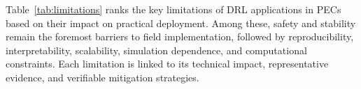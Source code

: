 






Table~\ref{tab:limitations} ranks the key limitations of DRL applications in PECs based on their impact on practical deployment. 
Among these, safety and stability remain the foremost barriers to field implementation, followed by reproducibility, interpretability, scalability, simulation dependence, and computational constraints. 
Each limitation is linked to its technical impact, representative evidence, and verifiable mitigation strategies.

